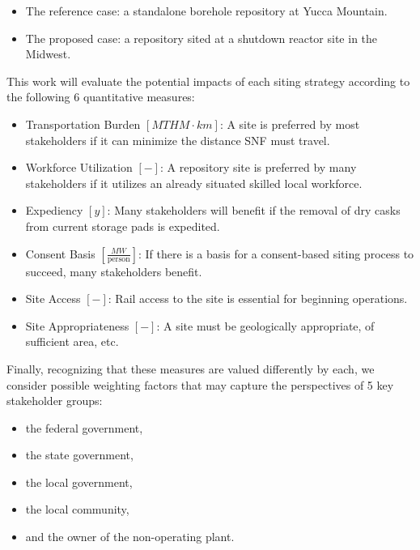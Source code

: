 \begin{itemize}
        \item The reference case: a standalone borehole repository at Yucca Mountain.  
        \item The proposed case: a repository sited at a shutdown reactor site 
                in the Midwest.

\end{itemize}

 This work will evaluate the potential impacts of each siting strategy according 
to the following 6 quantitative measures:

\begin{itemize}
        \item Transportation Burden $[MTHM \cdot km]$: A site is preferred by 
                most stakeholders if it can minimize the distance \gls{SNF} 
                must travel.
        \item Workforce Utilization $[-]$: A repository site is preferred by 
                many stakeholders if it utilizes an already situated skilled local 
                workforce. 
        \item Expediency $[y]$: Many stakeholders will benefit if the removal 
                of dry casks from current storage pads is expedited.
        \item Consent Basis $[\frac{MW}{\mbox{person}}]$: If there is a basis for a consent-based 
                siting process to succeed, many stakeholders benefit.
        \item Site Access $[-]$: Rail access to the site is essential for 
                beginning operations.
        \item Site Appropriateness $[-]$: A site must be geologically 
                appropriate, of sufficient area, etc.
\end{itemize}

Finally, recognizing that these measures are valued differently by each, we
consider possible weighting factors that may capture the perspectives of 5 key
stakeholder groups:

\begin{itemize}
        \item the federal government,
        \item the state government,
        \item the local government,
        \item the local community,
        \item and the owner of the non-operating plant.
\end{itemize}


